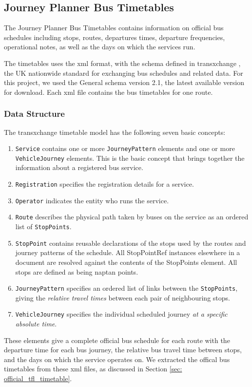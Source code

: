 \subsection{Journey Planner Bus Timetables}
The Journey Planner Bus Timetables \cite{open_data_feeds_description} contains information on official bus schedules including stops, routes, departures times, departure frequencies, operational notes, as well as the days on which the services run.

The timetables uses the \acrfull{xml} \cite{xml} format, with the schema defined in \gls{transxchange} \cite{transxchange}, the UK nationwide standard for exchanging bus schedules and related data. For this project, we used the General schema version 2.1\cite{transxchange_downloads_and_schema}\cite{transxchange_schema_2.1_xsd}, the latest available version for download. Each \acrshort{xml} file contains the bus timetables for one route.

\subsubsection{Data Structure}
The \gls{transxchange} timetable model has the following seven basic concepts\cite{transxchange_schema_guide}:

\begin{enumerate}
  \item \texttt{Service} contains one or more \texttt{JourneyPattern} elements and one or more \texttt{VehicleJourney} elements. This is the basic concept that brings together the information about a registered bus service.
  \item \texttt{Registration} specifies the registration details for a service.
  \item \texttt{Operator} indicates the entity who runs the service.
  \item \texttt{Route} describes the physical path taken by buses on the service as an ordered list of \texttt{StopPoints}.
  \item \texttt{StopPoint} contains reusable declarations of the stops used by the routes and journey patterns of the schedule. All StopPointRef instances elsewhere in a document are resolved against the contents of the StopPoints element. All stops are defined as being \gls{naptan} points.
  \item \texttt{JourneyPattern} specifies an ordered list of links between the \texttt{StopPoints}, giving the \emph{relative travel times} between each pair of neighbouring stops.
  \item \texttt{VehicleJourney} specifies the individual scheduled journey \emph{at a specific absolute time}.
\end{enumerate}

These elements give a complete official bus schedule for each route with the departure time for each bus journey, the relative bus travel time between stops, and the days on which the service operates on. We extracted the offical bus timetables from these \acrshort{xml} files, as discussed in Section \ref{sec: official_tfl_timetable}.
